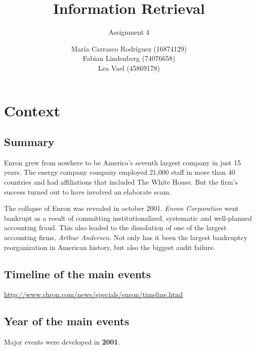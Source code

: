 \documentclass[a4paper,11pt,oneside]{book}
\title{Information Retrieval }
\subtitle{Assignment 4}
\author{ María Carrasco Rodríguez (16874129) \\
		Fabian Lindenberg (74076658)\\
		Lea Vael (45869178)}
\begin{document}
\kostspieligmaketitle


\chapter{Context}
\section{Summary}
Enron grew from nowhere to be America's seventh largest company in just 15 years. The energy company company employed 21,000 staff in more than 40 countries and had affiliations that included The White House. But the firm's success turned out to have involved an elaborate scam. 

The collapse of Enron was revealed in october 2001. {\it Enron Corporation} went bankrupt as a result of committing institutionalized, systematic and well-planned accounting fraud. This also leaded to the dissolution of one of the largest accounting firms, {\it Arthur Andersen}. Not only has it been the largest bankruptcy reorganization in American history, but also the biggest audit failure.


\section{Timeline of the main events}
\url{http://www.chron.com/news/specials/enron/timeline.html}

\section{Year of the main events}
Major events were developed in {\bf2001}.
\end{document}
